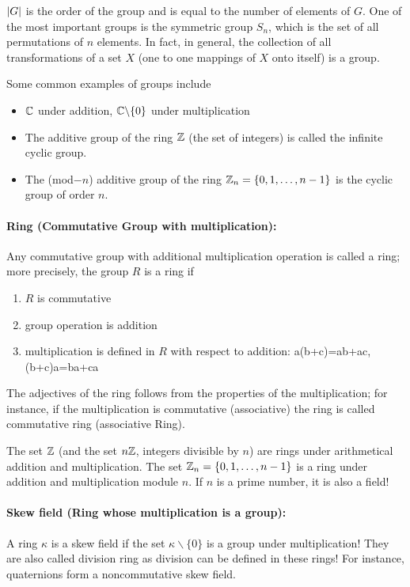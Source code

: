 $\abs{G}$ is the order of the group and is equal to the number of elements of $G$. One of the most important groups is the symmetric group  $S_n$, which is the set of all permutations of $n$ elements. In fact, in general, the collection of all transformations of a set $X$ (one to one mappings of $X$ onto itself) is a group.

Some common examples of groups include
\begin{itemize}
	\item $\mathbb{C}$ under addition, $\mathbb{C}\backslash\{0\}$ under multiplication
	\item The additive group of the ring $\mathbb{Z}$ (the set of integers) is called the infinite cyclic group.
	\item The (mod$-n$) additive group of the ring $\mathbb{Z}_n=\{0,1,\dots,n-1\}$ is the cyclic group of order $n$.
\end{itemize}

\paragraph{Ring (Commutative Group with multiplication):} Any commutative group with additional multiplication operation is called a ring; more precisely, the group $R$ is a ring if
\begin{enumerate}
	\item $R$ is commutative
	\item group operation is addition
	\item multiplication is defined in $R$ with respect to addition:
	\be 
	a(b+c)=ab+ac\;,(b+c)a=ba+ca
	\ee 
\end{enumerate}
The adjectives of the ring follows from the properties of the multiplication; for instance, if the multiplication is commutative (associative) the ring is called commutative ring (associative Ring).

The set $\mathbb{Z}$ (and the set $n\mathbb{Z}$, integers divisible by $n$) are rings under arithmetical addition and multiplication. The set $\mathbb{Z}_n=\{0,1,\dots,n-1\}$ is a ring under addition and multiplication module $n$. If $n$ is a prime number, it is also a field!

\paragraph{Skew field (Ring whose multiplication is a group):}  A ring $\kappa$ is a skew field if the set $\kappa\backslash \{0\}$ is a group under multiplication! They are also called division ring as division can be defined in these rings! For instance, quaternions form a noncommutative skew field. 

